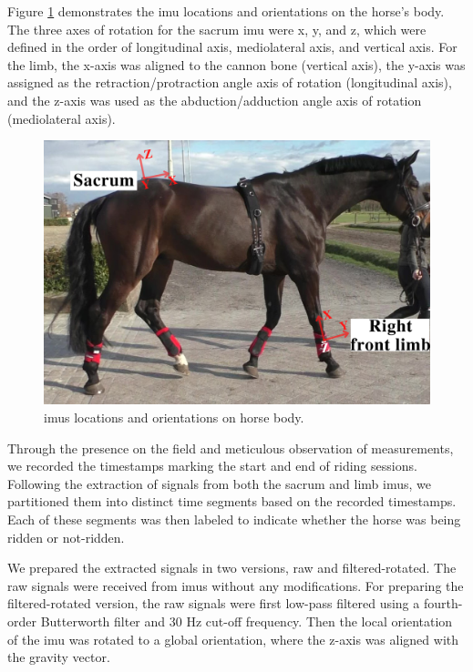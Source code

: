 Figure \ref{fig:two IMU on horse} demonstrates the \gls{imu} locations and orientations on the horse's body. The three axes of rotation for the sacrum \gls{imu} were x, y, and z, which were defined in the order of longitudinal axis, mediolateral axis, and vertical axis. For the limb, the x-axis was aligned to the cannon bone (vertical axis), the y-axis was assigned as the retraction/protraction angle axis of rotation (longitudinal axis), and the z-axis was used as the abduction/adduction angle axis of rotation (mediolateral axis).

\begin{figure}[htbp]
\centering
\includegraphics[width=.75\linewidth]{chapters/fatigue/figures/Picture7.png}
\caption{\gls{imu}s locations and orientations on horse body.}
\label{fig:two IMU on horse}
\end{figure}


Through the presence on the field and meticulous observation of measurements, we recorded the timestamps marking the start and end of riding sessions. Following the extraction of signals from both the sacrum and limb \gls{imu}s, we partitioned them into distinct time segments based on the recorded timestamps. Each of these segments was then labeled to indicate whether the horse was being ridden or not-ridden.


We prepared the extracted signals in two versions, raw and filtered-rotated. The raw signals were received from \gls{imu}s without any modifications. For preparing the filtered-rotated version, the raw signals were first low-pass filtered using a fourth-order Butterworth filter and 30 Hz cut-off frequency. Then the local orientation of the \gls{imu} was rotated to a global orientation, where the z-axis was aligned with the gravity vector. 
 
